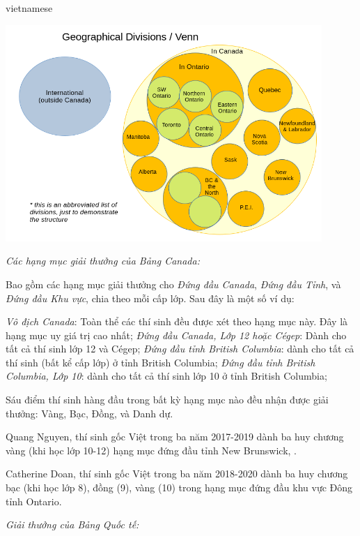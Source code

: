\documentclass{article}
\begin{document}
\begin{otherlanguage*}{vietnamese}
\begin{center}
    \includegraphics[width=12cm]{./png/divisions-venn-en-2.png}
\end{center}

\textit{Các hạng mục giải thưởng của Bảng Canada:}

Bao gồm các hạng mục giải thưởng cho \textit{Đứng đầu Canada}, \textit{Đứng đầu Tỉnh}, và \textit{Đứng đầu Khu vực}, chia theo mỗi cấp lớp. Sau đây là một số ví dụ:
\begin{itemize}[topsep=0pt, partopsep=0pt, itemsep=0pt]
    \ii \textit{Vô địch Canada}: Toàn thể các thí sinh đều được xét theo hạng mục này. Đây là hạng mục uy giá trị cao nhất;
    \ii \textit{Đứng đầu Canada, Lớp 12 hoặc Cégep}: Dành cho tất cả thí sinh lớp 12 và Cégep;
    \ii \textit{Đứng đầu tỉnh British Columbia}: dành cho tất cả thí sinh (bất kể cấp lớp) ở tỉnh British Columbia;
    \ii \textit{Đứng đầu tỉnh British Columbia, Lớp 10}: dành cho tất cả thí sinh lớp 10 ở tỉnh British Columbia;
\end{itemize}

Sáu điểm thí sinh hàng đầu trong bất kỳ hạng mục nào đều nhận được giải thưởng: Vàng, Bạc, Đồng, và Danh dự.

\begin{remark*}
    Quang Nguyen, thí sinh gốc Việt trong ba năm 2017-2019 dành ba huy chương vàng (khi học lớp 10-12) hạng mục đứng đầu tỉnh New Brunswick, . 
    
    Catherine Doan, thí sinh gốc Việt trong ba năm 2018-2020 dành ba huy chương bạc (khi học lớp 8), đồng (9), vàng (10) trong hạng mục đứng đầu khu vực Đông tỉnh Ontario.
\end{remark*}

\textit{Giải thưởng của Bảng Quốc tế:}


\end{otherlanguage*}
\end{document}
